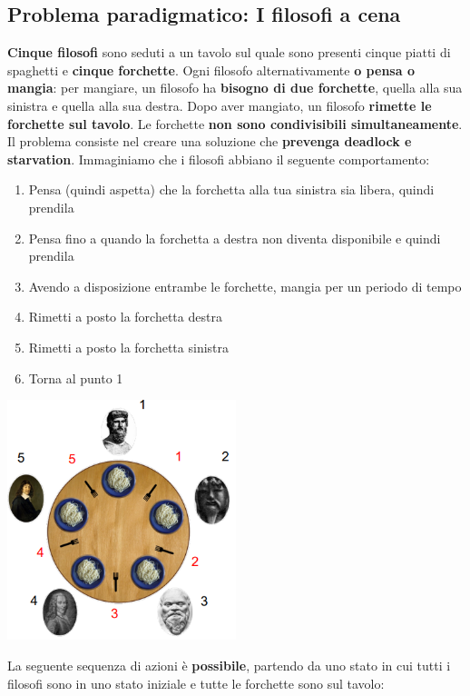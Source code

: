 \documentclass[12pt]{article}
\begin{document}
\subsection{Problema paradigmatico: I filosofi a cena}
\textbf{Cinque filosofi} sono seduti a un tavolo sul quale sono presenti cinque piatti di spaghetti e \textbf{cinque forchette}. Ogni filosofo alternativamente \textbf{o pensa o mangia}: per mangiare, un filosofo ha \textbf{bisogno di due forchette}, quella alla sua sinistra e quella alla sua destra. Dopo aver mangiato, un filosofo \textbf{rimette le forchette sul tavolo}. Le forchette \textbf{non sono condivisibili simultaneamente}. Il problema consiste nel creare una soluzione che \textbf{prevenga deadlock e starvation}. \newline
Immaginiamo che i filosofi abbiano il seguente comportamento:
\begin{enumerate}
    \item Pensa (quindi aspetta) che la forchetta alla tua sinistra sia libera, quindi prendila
    \item Pensa fino a quando la forchetta a destra non diventa disponibile e quindi prendila
    \item Avendo a disposizione entrambe le forchette, mangia per un periodo di tempo
    \item Rimetti a posto la forchetta destra
    \item Rimetti a posto la forchetta sinistra
    \item Torna al punto 1
\end{enumerate}
\begin{center}
    \includegraphics[width = 0.50\textwidth]{Images/105.PNG}
\end{center}
La seguente sequenza di azioni è \textbf{possibile}, partendo da uno stato in cui tutti i filosofi sono in uno stato iniziale e tutte le forchette sono sul tavolo:
\end{document}
